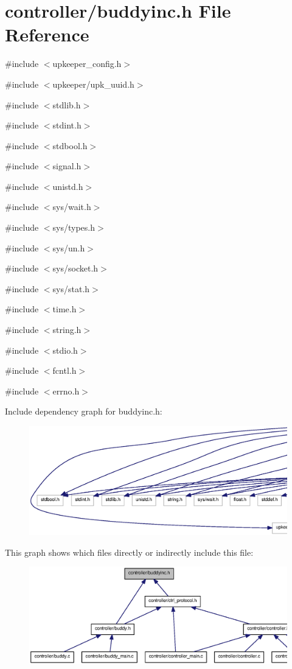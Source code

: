 \section{controller/buddyinc.h File Reference}
\label{buddyinc_8h}
{\ttfamily \#include $<$upkeeper\_\-config.h$>$}\par
{\ttfamily \#include $<$upkeeper/upk\_\-uuid.h$>$}\par
{\ttfamily \#include $<$stdlib.h$>$}\par
{\ttfamily \#include $<$stdint.h$>$}\par
{\ttfamily \#include $<$stdbool.h$>$}\par
{\ttfamily \#include $<$signal.h$>$}\par
{\ttfamily \#include $<$unistd.h$>$}\par
{\ttfamily \#include $<$sys/wait.h$>$}\par
{\ttfamily \#include $<$sys/types.h$>$}\par
{\ttfamily \#include $<$sys/un.h$>$}\par
{\ttfamily \#include $<$sys/socket.h$>$}\par
{\ttfamily \#include $<$sys/stat.h$>$}\par
{\ttfamily \#include $<$time.h$>$}\par
{\ttfamily \#include $<$string.h$>$}\par
{\ttfamily \#include $<$stdio.h$>$}\par
{\ttfamily \#include $<$fcntl.h$>$}\par
{\ttfamily \#include $<$errno.h$>$}\par
Include dependency graph for buddyinc.h:
\nopagebreak
\begin{figure}[H]
\begin{center}
\leavevmode
\includegraphics[width=400pt]{buddyinc_8h__incl}
\end{center}
\end{figure}
This graph shows which files directly or indirectly include this file:\nopagebreak
\begin{figure}[H]
\begin{center}
\leavevmode
\includegraphics[width=400pt]{buddyinc_8h__dep__incl}
\end{center}
\end{figure}
